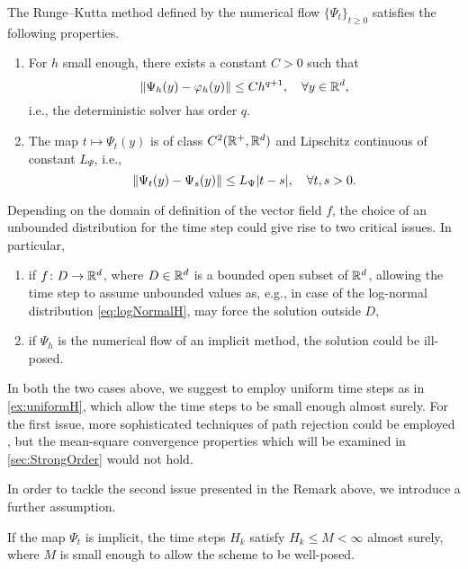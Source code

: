 \documentclass[10pt]{article}
\begin{document}
\begin{assumption}\label{as:PsiStrong} The Runge--Kutta method defined by the numerical flow $\{\Psi_t\}_{t\geq 0}$ satisfies the following properties.
	\begin{enumerate}
		\item\label{as:PsiStrong_Order} For $h$ small enough, there exists a constant $C > 0$ such that
		\begin{equation}
		\lVert\Psi_h(y) - \varphi_h(y)\rVert \leq Ch^{q+1}, \quad \forall y \in \mathbb{R}^d,
		\end{equation}
		i.e., the deterministic solver has order $q$.
		\item\label{as:PsiStrong_Time} The map $t \mapsto \Psi_t(y)$ is of class $C^2(\mathbb{R}^+, \mathbb{R}^d)$ and Lipschitz continuous of constant $L_\Psi$, i.e.,
		\begin{equation}\label{eq:LipschitzPsiT}
		\lVert\Psi_t(y) - \Psi_s(y)\rVert \leq L_\Psi \lvert t - s\rvert, \quad \forall t, s > 0.
		\end{equation}
	\end{enumerate}
\end{assumption}

\begin{remark} Depending on the domain of definition of the vector field $f$, the choice of an unbounded distribution for the time step could give rise to two critical issues. In particular, 
	\begin{enumerate}
		\item if $f\colon D \to \mathbb{R}^d$, where $D \in \mathbb{R}^d$ is a bounded open subset of $\mathbb{R}^d$, allowing the time step to assume unbounded values as, e.g., in case of the log-normal distribution \eqref{eq:logNormalH}, may force the solution outside $D$,
		\item if $\Psi_h$ is the numerical flow of an implicit method, the solution could be ill-posed.
	\end{enumerate}
	In both the two cases above, we suggest to employ uniform time steps as in \cref{ex:uniformH}, which allow the time steps to be small enough almost surely. For the first issue, more sophisticated techniques of path rejection could be employed \cite{MiT05}, but the mean-square convergence properties which will be examined in \cref{sec:StrongOrder} would not hold. 
\end{remark}

In order to tackle the second issue presented in the Remark above, we introduce a further assumption.

\begin{assumption}\label{as:hImplicit} If the map $\Psi_t$ is implicit, the time steps $H_k$ satisfy $H_k \leq M < \infty$ almost surely, where $M$ is small enough to allow the scheme to be well-posed.
\end{assumption}
\end{document}
